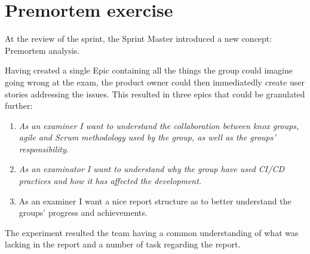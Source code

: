 \section{Premortem exercise}
At the review of the sprint, the Sprint Master introduced a new concept: Premortem analysis.

Having created a single Epic containing all the things the group could imagine going wrong at the exam, the product owner could then immediatedly create user stories addressing the issues. 
This resulted in three epics that could be granulated further:
\begin{enumerate}
\item {\textit{As an examiner I want to understand the collaboration between knox groups, agile and Scrum methodology used by the group, as well as the groups' responsibility.}}
\item {\textit{As an examinator I want to understand why the group have used CI/CD practices and how it has affected the development.}}
\item {As an examiner I want a nice report structure as to better understand the groups' progress and achievements. }
\end{enumerate}

The experiment resulted the team having a common understanding of what was lacking in the report and a number of task regarding the report. 



